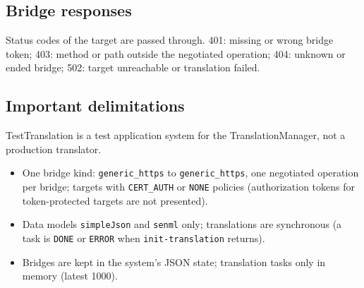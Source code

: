 \documentclass[a4paper]{arrowhead}
\begin{document}
\subsection{Bridge responses}
Status codes of the target are passed through. 401: missing or wrong bridge token; 403: method or path outside the negotiated operation; 404: unknown or ended bridge; 502: target unreachable or translation failed.
\subsection{Important delimitations}
TestTranslation is a test application system for the TranslationManager, not a production translator.
\begin{itemize}
\item One bridge kind: \texttt{generic\_https} to \texttt{generic\_https}, one negotiated operation per bridge; targets with \texttt{CERT\_AUTH} or \texttt{NONE} policies (authorization tokens for token-protected targets are not presented).
\item Data models \texttt{simpleJson} and \texttt{senml} only; translations are synchronous (a task is \texttt{DONE} or \texttt{ERROR} when \texttt{init-translation} returns).
\item Bridges are kept in the system's JSON state; translation tasks only in memory (latest 1000).
\end{itemize}
\end{document}
